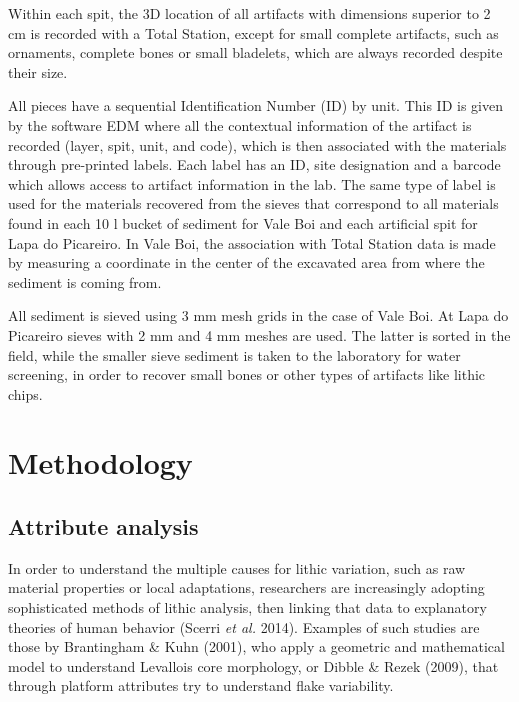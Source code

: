 \documentclass[12pt,twoside]{reedthesis}
\begin{document}
Within each spit, the 3D location of all artifacts with dimensions superior to 2 cm is recorded with a Total Station, except for small complete artifacts, such as ornaments, complete bones or small bladelets, which are always recorded despite their size.

All pieces have a sequential Identification Number (ID) by unit. This ID is given by the software EDM where all the contextual information of the artifact is recorded (layer, spit, unit, and code), which is then associated with the materials through pre-printed labels. Each label has an ID, site designation and a barcode which allows access to artifact information in the lab. The same type of label is used for the materials recovered from the sieves that correspond to all materials found in each 10 l bucket of sediment for Vale Boi and each artificial spit for Lapa do Picareiro. In Vale Boi, the association with Total Station data is made by measuring a coordinate in the center of the excavated area from where the sediment is coming from.

All sediment is sieved using 3 mm mesh grids in the case of Vale Boi. At Lapa do Picareiro sieves with 2 mm and 4 mm meshes are used. The latter is sorted in the field, while the smaller sieve sediment is taken to the laboratory for water screening, in order to recover small bones or other types of artifacts like lithic chips.

\hypertarget{methodology}{%
\chapter{Methodology}\label{methodology}}

\hypertarget{attribute-analysis}{%
\section{Attribute analysis}\label{attribute-analysis}}

In order to understand the multiple causes for lithic variation, such as raw material properties or local adaptations, researchers are increasingly adopting sophisticated methods of lithic analysis, then linking that data to explanatory theories of human behavior (Scerri \emph{et al.} 2014). Examples of such studies are those by Brantingham \& Kuhn (2001), who apply a geometric and mathematical model to understand Levallois core morphology, or Dibble \& Rezek (2009), that through platform attributes try to understand flake variability.
\end{document}
